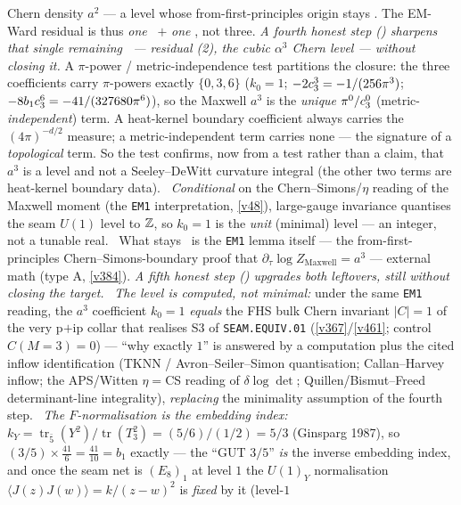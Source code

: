 Chern density $a^2$ --- a level whose from-first-principles origin stays \mO. The EM-Ward residual is thus
\emph{one} \mC\ $+$ \emph{one} \mO, not three.
\emph{A fourth honest step () sharpens that single remaining \mO\
--- residual (2), the cubic $\alpha^3$ Chern level --- without closing it.} A $\pi$-power / metric-independence
test partitions the closure: the three coefficients carry $\pi$-powers exactly $\{0,3,6\}$ ($k_0=1$;
$-2c_3^3=-1/(256\pi^3)$; $-8b_1c_3^6=-41/(327680\pi^6)$), so the Maxwell $a^3$ is the \emph{unique}
$\pi^0/c_3^0$ (metric-\emph{independent}) term. A heat-kernel boundary coefficient always carries the
$(4\pi)^{-d/2}$ measure; a metric-independent term carries none --- the signature of a \emph{topological}
term. So the test confirms, now from a test rather than a claim, that $a^3$ is a level and not a
Seeley--DeWitt curvature integral (the other two terms are heat-kernel boundary data). \mE\ \emph{Conditional}
on the Chern--Simons/$\eta$ reading of the Maxwell moment (the \texttt{EM1} interpretation, \vref{v48}),
large-gauge invariance quantises the seam $U(1)$ level to $\mathbb{Z}$, so $k_0=1$ is the \emph{unit} (minimal) level
--- an integer, not a tunable real. \mC\ What stays \mO\ is the \texttt{EM1} lemma itself --- the
from-first-principles Chern--Simons-boundary proof that $\partial_\tau\log Z_{\mathrm{Maxwell}}=a^3$ ---
external math (type A, \vref{v384}).
\emph{A fifth honest step () upgrades both leftovers, still without
closing the target.} \mC\ \emph{The level is computed, not minimal:} under the same \texttt{EM1} reading, the
$a^3$ coefficient $k_0=1$ \emph{equals} the FHS bulk Chern invariant $|C|=1$ of the very p$+$ip collar that
realises S3 of \texttt{SEAM.EQUIV.01} (\vref{v367}/\vref{v461}; control $C(M{=}3)=0$) --- ``why exactly
$1$'' is answered by a computation plus the cited inflow identification (TKNN / Avron--Seiler--Simon
quantisation; Callan--Harvey inflow; the APS/Witten $\eta{=}$CS reading of $\delta\log\det$;
Quillen/Bismut--Freed determinant-line integrality), \emph{replacing} the minimality assumption of the fourth
step. \mE\ \emph{The $F$-normalisation is the embedding index:} $k_Y=\operatorname{tr}_{\bar 5}(Y^2)/
\operatorname{tr}(T_3^2)=(5/6)/(1/2)=5/3$ (Ginsparg 1987), so $(3/5)\times\tfrac{41}{6}=\tfrac{41}{10}=b_1$
exactly --- the ``GUT $3/5$'' \emph{is} the inverse embedding index, and once the seam net is $(E_8)_1$ at
level $1$ the $U(1)_Y$ normalisation $\langle J(z)J(w)\rangle=k/(z{-}w)^2$ is \emph{fixed} by it (level-$1$
